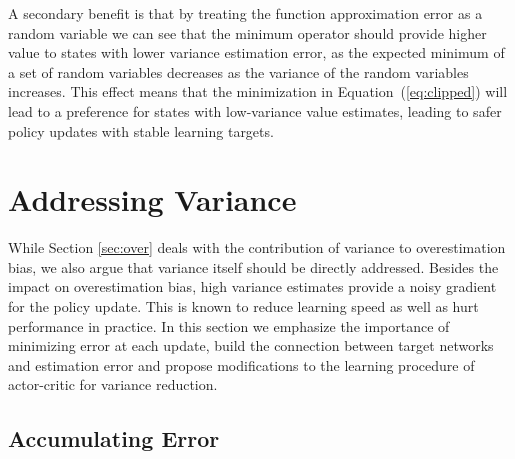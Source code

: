 \documentclass{article}
\begin{document}
A secondary benefit is that by treating the function approximation error as a random variable we can see that the minimum operator should provide higher value to states with lower variance estimation error, as the expected minimum of a set of random variables decreases as the variance of the random variables increases. This effect means that the minimization in Equation~(\ref{eq:clipped}) will lead to a preference for states with low-variance value estimates, leading to safer policy updates with stable learning targets.

\section{Addressing Variance} \label{sec:var}

While Section \ref{sec:over} deals with the contribution of variance to overestimation bias, we also argue that variance itself should be directly addressed. Besides the impact on overestimation bias, high variance estimates provide a noisy gradient for the policy update. This is known to reduce learning speed \citep{sutton1998reinforcement} as well as hurt performance in practice. In this section we emphasize the importance of minimizing error at each update, build the connection between target networks and estimation error and propose modifications to the learning procedure of actor-critic for variance reduction. 

\subsection{Accumulating Error} \label{sec:acerror}
\end{document}

